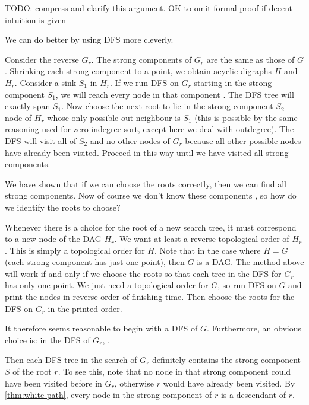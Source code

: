 {\color{red} TODO: compress and clarify this argument. OK to omit formal proof if decent intuition is given}

We can do better by using DFS more cleverly. 

Consider the reverse $G_r$. The strong components of $G_r$ are the
same as those of $G$. Shrinking each strong component to a point,
we obtain  acyclic digraphs $H$ and $H_r$. Consider a sink $S_1$ in
$H_r$. If we run DFS on $G_r$ starting  in the strong component
$S_1$, we will reach every node in that component . The DFS tree will exactly span $S_1$. Now
choose the next root to lie in the strong component $S_2$ node of
$H_r$ whose only possible out-neighbour is $S_1$ (this is possible
by the same reasoning used for zero-indegree sort, except here we
deal with outdegree). The DFS will visit all of $S_2$ and no other
nodes of $G_r$ because all other possible nodes have already been
visited. Proceed in this way until we have visited all strong
components.

We have shown that if we can choose the roots correctly, then we can
find all strong components. Now of course we don't know these components
, so how do we identify the roots to choose?

Whenever there is a choice for the root of a new search tree, it must
correspond to a new node of the DAG $H_r$. We want at least a reverse
topological order of $H_r$. This is simply a topological order for
$H$. Note that in the case where $H=G$ (each strong component has just
one point), then $G$ is a DAG. The method above will work if and only
if we choose the roots so that each tree in the DFS for $G_r$ has only
one point. We just need a topological order for $G$, so run DFS on $G$
and print the nodes in reverse order of finishing time. Then choose the
roots for the DFS on $G_r$ in the printed order.

It therefore seems reasonable to begin with a DFS of $G$. Furthermore,
an obvious choice is: in the DFS of $G_r$, .

Then each DFS tree in the search of $G_r$ definitely contains the strong
component $S$ of the root $r$. To see this, note that no node in that
strong component could have been visited before in $G_r$, otherwise $r$
would have already been visited. By \cref{thm:white-path}, every
node in the strong component of $r$ is a descendant of $r$.

